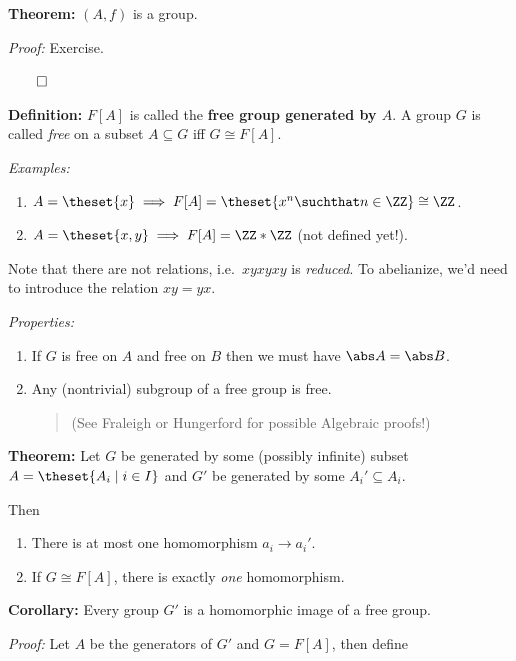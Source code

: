 \textbf{Theorem:} \((A, f)\) is a group.

\emph{Proof:} Exercise.

\(\qed\)

\textbf{Definition:} \(F[A]\) is called the \textbf{free group generated
by \(A\)}. A group \(G\) is called \emph{free} on a subset
\(A \subseteq G\) iff \(G \cong F[A]\).

\emph{Examples:}

\begin{enumerate}
\def\labelenumi{\arabic{enumi}.}
\item
  \(A = \theset{x} \implies F[A] = \theset{x^n \suchthat n \in \ZZ} \cong \ZZ\).
\item
  \(A = \theset{x, y} \implies F[A] = \ZZ \ast \ZZ\) (not defined yet!).
\end{enumerate}

Note that there are not relations, i.e.~\(xyxyxy\) is \emph{reduced}. To
abelianize, we'd need to introduce the relation \(xy = yx\).

\emph{Properties:}

\begin{enumerate}
\def\labelenumi{\arabic{enumi}.}
\item
  If \(G\) is free on \(A\) and free on \(B\) then we must have
  \(\abs A = \abs B\).
\item
  Any (nontrivial) subgroup of a free group is free.

  \begin{quote}
  (See Fraleigh or Hungerford for possible Algebraic proofs!)
  \end{quote}
\end{enumerate}

\textbf{Theorem:} Let \(G\) be generated by some (possibly infinite)
subset \(A = \theset{A_i\mid i\in I}\) and \(G'\) be generated by some
\(A_i' \subseteq A_i\).

Then

\begin{enumerate}
\def\labelenumi{\alph{enumi}.}
\item
  There is at most one homomorphism \(a_i \to a_i'\).
\item
  If \(G \cong F[A]\), there is exactly \emph{one} homomorphism.
\end{enumerate}

\textbf{Corollary:} Every group \(G'\) is a homomorphic image of a free
group.

\emph{Proof:} Let \(A\) be the generators of \(G'\) and \(G = F[A]\),
then define

